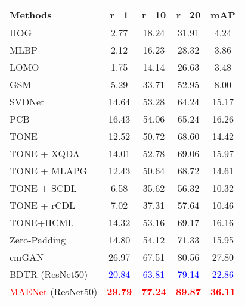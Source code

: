 \begin{table}[!htpb]
  \centering
  \begin{tabular}{cccccc}
     \\ \hline
  \multicolumn{2}{l|}{Methods} & r=1 &r=10 & r=20 & mAP   \\\hline
  
  \multicolumn{2}{l|}{HOG} & 2.77 & 18.24 & 31.91 & 4.24  \\
  \multicolumn{2}{l|}{MLBP} & 2.12 & 16.23 & 28.32 & 3.86  \\
  \multicolumn{2}{l|}{LOMO\cite{liao2015person}} &  1.75 & 14.14 & 26.63 & 3.48 \\
  \multicolumn{2}{l|}{GSM\cite{lin2016cross}} &  5.29 & 33.71 & 52.95 & 8.00  \\

  \hline
  \hline
  \multicolumn{2}{l|}{SVDNet\cite{sun2017svdnet}} & 14.64 & 53.28 & 64.24 & 15.17  \\
  \multicolumn{2}{l|}{PCB\cite{sun2018beyond}} & 16.43 & 54.06 & 65.24 & 16.26  \\ 
  \hline
  \hline
  \multicolumn{2}{l|}{TONE\cite{ye2018hierarchical}} &  12.52 & 50.72 & 68.60 & 14.42  \\
  \multicolumn{2}{l|}{TONE + XQDA} &  14.01 & 52.78 & 69.06 & 15.97  \\
  \multicolumn{2}{l|}{TONE + MLAPG} &  12.43 & 50.64 & 68.72 & 14.61  \\
  \multicolumn{2}{l|}{TONE + SCDL} &  6.58 & 35.62 & 56.32 & 10.32  \\
  \multicolumn{2}{l|}{TONE + rCDL} &  7.02 & 37.31 & 57.64 & 10.46  \\
  \multicolumn{2}{l|}{TONE+HCML }& 14.32 & 53.16 & 69.17 & 16.16 \\
  \multicolumn{2}{l|}{Zero-Padding\cite{wu2017rgb} }& 14.80 & 54.12 & 71.33 & 15.95  \\
  \multicolumn{2}{l|}{cmGAN\cite{dai2018cross} }& 26.97 & 67.51 & 80.56 & 27.80  \\
  \multicolumn{2}{l|}{BDTR (ResNet50)\cite{ye2018visible} }& \textcolor{blue}{20.84} & \textcolor{blue}{63.81} & \textcolor{blue}{79.14} & \textcolor{blue}{22.86}  \\
  \hline
  \hline
   \multicolumn{2}{l|}{\textcolor{red}{MAENet} (ResNet50) }&\textcolor{red}{\textbf{29.79}} & \textcolor{red}{\textbf{77.24}} & \textcolor{red}{\textbf{89.87}} & \textcolor{red}{\textbf{36.11}} \\
   \hline
   \hline
  \end{tabular}
  \label{table:visiblethermalsysu}
\end{table}
